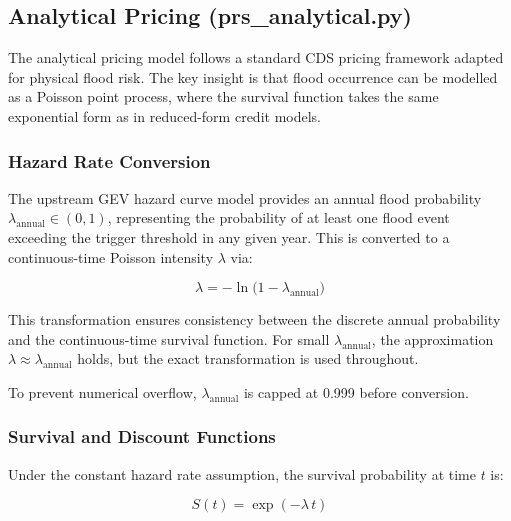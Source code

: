 \documentclass[11pt,a4paper]{article}
\begin{document}
\mkmframework

\subsection{Analytical Pricing (prs\_analytical.py)}
\label{sec:analytical}

The analytical pricing model follows a standard CDS pricing framework adapted for
physical flood risk. The key insight is that flood occurrence can be modelled as a
Poisson point process, where the survival function takes the same exponential form as
in reduced-form credit models.

\subsubsection{Hazard Rate Conversion}

The upstream GEV hazard curve model provides an annual flood probability
$\lambda_{\text{annual}} \in (0,1)$, representing the probability of at least one flood
event exceeding the trigger threshold in any given year. This is converted to a
continuous-time Poisson intensity $\lambda$ via:

\begin{equation}
    \lambda = -\ln\!\big(1 - \lambda_{\text{annual}}\big)
    \label{eq:hazard_conversion}
\end{equation}

This transformation ensures consistency between the discrete annual probability and the
continuous-time survival function. For small $\lambda_{\text{annual}}$, the approximation
$\lambda \approx \lambda_{\text{annual}}$ holds, but the exact transformation is used
throughout.

To prevent numerical overflow, $\lambda_{\text{annual}}$ is capped at 0.999 before
conversion.

\subsubsection{Survival and Discount Functions}

Under the constant hazard rate assumption, the survival probability at time $t$ is:

\begin{equation}
    S(t) = \exp(-\lambda\, t)
    \label{eq:survival}
\end{equation}
\end{document}
